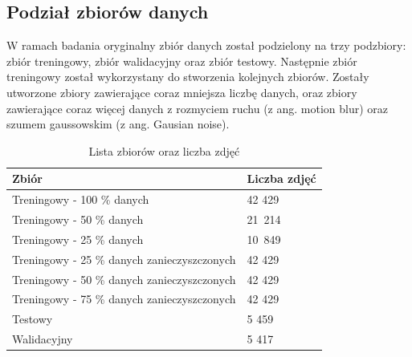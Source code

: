 \subsection{Podział zbiorów danych}
W ramach badania oryginalny zbiór danych został podzielony na trzy podzbiory: zbiór treningowy, zbiór walidacyjny oraz zbiór testowy. Następnie zbiór treningowy został wykorzystany do stworzenia kolejnych zbiorów. Zostały utworzone zbiory zawierające coraz mniejsza liczbę danych, oraz zbiory zawierające coraz więcej danych z rozmyciem ruchu (z ang. motion blur) oraz szumem gaussowskim (z ang. Gausian noise).
\begin{table}[H]
	\centering
	\begin{tabular}{|l|l|}
		\hline
		Zbiór                                       & Liczba zdjęć \\ \hline
		Treningowy - 100 \% danych                  & 42 429            \\ \hline
		Treningowy - 50 \% danych                   & 21 214            \\ \hline
		Treningowy - 25 \% danych                   & 10 849            \\ \hline
		Treningowy - 25 \% danych zanieczyszczonych & 42 429            \\ \hline
		Treningowy - 50 \% danych zanieczyszczonych & 42 429            \\ \hline
		Treningowy - 75 \% danych zanieczyszczonych & 42 429            \\ \hline
		Testowy                                     & 5 459            \\ \hline
		Walidacyjny                                 & 5 417            \\ \hline
	\end{tabular}
\caption{Lista zbiorów oraz liczba zdjęć }
\label{tab:data_list}
\end{table}
